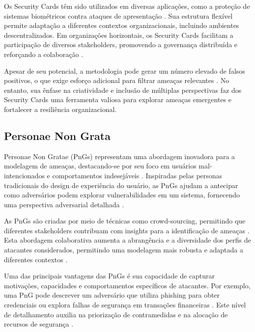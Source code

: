 Os Security Cards têm sido utilizados em diversas aplicações, como a
proteção de sistemas biométricos contra ataques de apresentação
\cite{AttackTreesforProtectingBiometric}. Sua estrutura flexível
permite adaptação a diferentes contextos organizacionais, incluindo
ambientes descentralizados. Em organizações horizontais, os Security
Cards facilitam a participação de diversos stakeholders, promovendo a
governança distribuída e reforçando a colaboração
\cite{CyberThreatModeling}.

Apesar de seu potencial, a metodologia pode gerar um número elevado de
falsos positivos, o que exige esforço adicional para filtrar ameaças
relevantes \cite{KeepingAheadofOurAdversaries}. No entanto, sua ênfase
na criatividade e inclusão de múltiplas perspectivas faz dos Security
Cards uma ferramenta valiosa para explorar ameaças emergentes e
fortalecer a resiliência organizacional.

\subsection{Personae Non Grata}
\label{subsec:personae_non_grata}

Personae Non Gratae (PnGs) representam uma abordagem inovadora para a
modelagem de ameaças, destacando-se por seu foco em usuários
mal-intencionados e comportamentos indesejáveis
\cite{PersonaeNonGratae}. Inspiradas pelas personas tradicionais do
design de experiência do usuário, as PnGs ajudam a antecipar como
adversários podem explorar vulnerabilidades em um sistema, fornecendo
uma perspectiva adversarial detalhada
\cite{PnGRequirementsPhaseThreatModeling}.

As PnGs são criadas por meio de técnicas como crowd-sourcing,
permitindo que diferentes stakeholders contribuam com insights para a
identificação de ameaças \cite{PnGRequirementsPhaseThreatModeling}.
Esta abordagem colaborativa aumenta a abrangência e a diversidade dos
perfis de atacantes considerados, permitindo uma modelagem mais
robusta e adaptada a diferentes contextos \cite{PersonaeNonGratae}.

Uma das principais vantagens das PnGs é sua capacidade de capturar
motivações, capacidades e comportamentos específicos de atacantes. Por
exemplo, uma PnG pode descrever um adversário que utiliza phishing
para obter credenciais ou explora falhas de segurança em transações
financeiras \cite{PersonaeNonGratae}. Este nível de detalhamento
auxilia na priorização de contramedidas e na alocação de recursos de
segurança \cite{PnGRequirementsPhaseThreatModeling}.

